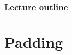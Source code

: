 
  








\begin{frame}
\frametitle{Lecture outline}
\tableofcontents
\end{frame}
\section{Padding}

